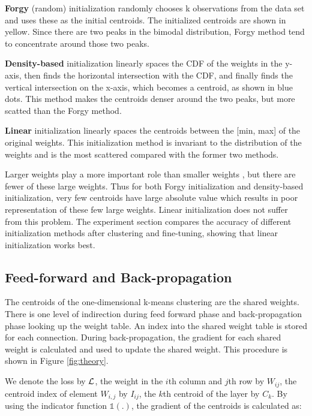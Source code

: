 \documentclass{article} %
\begin{document}
{\bf Forgy} (random) initialization randomly chooses k observations from the data set and uses these as the initial centroids. The initialized centroids are shown in yellow. Since there are two peaks in the bimodal distribution, Forgy method tend to concentrate around those two peaks. 

{\bf Density-based} initialization linearly spaces the CDF of the weights in the y-axis, then finds the horizontal intersection with the CDF, and finally finds the vertical intersection on the x-axis, which becomes a centroid, as shown in blue dots. This method makes the centroids denser around the two peaks, but more scatted than the Forgy method.

{\bf Linear} initialization linearly spaces the centroids between the [min, max] of the original weights. This initialization method is invariant to the distribution of the weights and is the most scattered compared with the former two methods.

Larger weights play a more important role than smaller weights \citep{song_pruning}, but there are fewer of these large weights. Thus for both Forgy initialization and density-based initialization, very few centroids have large absolute value which results in poor representation of these few large weights. Linear initialization does not suffer from this problem. The experiment section compares the accuracy of different initialization methods after clustering and fine-tuning, showing that linear initialization works best. 

\subsection{Feed-forward and Back-propagation}
The centroids of the one-dimensional k-means clustering are the shared weights. There is one level of indirection during feed forward phase and back-propagation phase looking up the weight table.   An index into the shared weight table is stored for each connection.  During back-propagation, the gradient for each shared weight is calculated and used to update
the shared weight. This procedure is shown in Figure \ref{fig:theory}.


We denote the loss by $\cal{L}$, the weight in the $i$th column and $j$th row by $W_{ij}$, the centroid index of element $W_{i,j}$ by $I_{ij}$, the $k$th centroid of the layer by $C_k$. By using the indicator function $\mathds{1}(.)$, the gradient of the centroids is calculated as:
\end{document}

